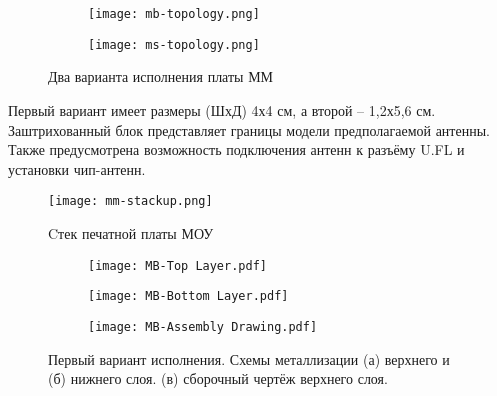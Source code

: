 \begin{figure}[H]
	\centering
	\begin{subfigure}[c]{0.49\textwidth}
		\centering
		\texttt{[image: mb-topology.png]}
		\caption{}%
		\label{fig:mb-topology}
	\end{subfigure}
	\hfill
	\begin{subfigure}[c]{0.49\textwidth}
		\centering
		\texttt{[image: ms-topology.png]}
		\caption{}%
		\label{fig:ms-topology}
	\end{subfigure}
	\caption{%
		Два варианта исполнения платы ММ
	}%
	\label{fig:mm-topology}
\end{figure}

Первый вариант имеет размеры (ШхД) 4х4 см, а второй – 1,2х5,6 см. Заштрихованный блок представляет границы модели предполагаемой антенны. Также предусмотрена возможность подключения антенн к разъёму U.FL и установки чип-антенн.

\begin{figure}[H]
	\centering
	\texttt{[image: mm-stackup.png]}
	\caption{Cтек печатной платы МОУ}
	\label{fig:mm-stackup}
\end{figure}

\begin{figure}[H]
	\centering
	\begin{subfigure}[c]{0.3\textwidth}
		\centering
		\texttt{[image: MB-Top Layer.pdf]}
		\caption{}%
		\label{fig:MB-TopLayer}
	\end{subfigure}
	\hfil
	\begin{subfigure}[c]{0.3\textwidth}
		\centering
		\texttt{[image: MB-Bottom Layer.pdf]}
		\caption{}%
		\label{fig:MB-BottomLayer}
	\end{subfigure}
	\hfil
	\begin{subfigure}[c]{0.3\textwidth}
		\centering
		\texttt{[image: MB-Assembly Drawing.pdf]}
		\caption{}%
		\label{fig:MB-AssemblyDrawing}
	\end{subfigure}
	\caption{Первый вариант исполнения. Схемы металлизации (а) верхнего и (б) нижнего слоя. (в) сборочный чертёж верхнего слоя.}
	\label{fig:mb-layers}
\end{figure}

